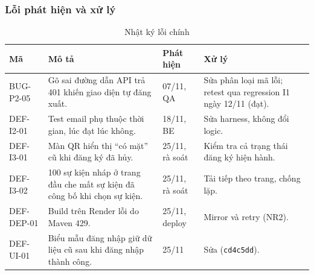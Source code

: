 \subsubsection{Lỗi phát hiện và xử lý}

\begin{table}[H]
\centering\footnotesize
\caption{Nhật ký lỗi chính}\label{tab:t3-defects}
\begin{tabularx}{\linewidth}{@{}p{.12\linewidth}Xp{.10\linewidth}p{.25\linewidth}@{}}
\toprule
\textbf{Mã} & \textbf{Mô tả} & \textbf{Phát hiện} & \textbf{Xử lý}\\\midrule
BUG-P2-05 & Gõ sai đường dẫn API trả 401 khiến giao diện tự đăng xuất. & 07/11, QA & Sửa phân loại mã lỗi; retest qua regression I1 ngày 12/11 (đạt).\\
DEF-I2-01 & Test email phụ thuộc thời gian, lúc đạt lúc không. & 18/11, BE & Sửa harness, không đổi logic.\\
DEF-I3-01 & Màn QR hiển thị ``có mặt'' cũ khi đăng ký đã hủy. & 25/11, rà soát & Kiểm tra cả trạng thái đăng ký hiện hành.\\
DEF-I3-02 & 100 sự kiện nháp ở trang đầu che mất sự kiện đã công bố khi chọn sự kiện. & 25/11, rà soát & Tải tiếp theo trang, chống lặp.\\
DEF-DEP-01 & Build trên Render lỗi do Maven 429. & 25/11, deploy & Mirror và retry (NR2).\\
DEF-UI-01 & Biểu mẫu đăng nhập giữ dữ liệu cũ sau khi đăng nhập thành công. & 25/11 & Sửa (\texttt{cd4c5dd}).\\
\bottomrule
\end{tabularx}
\end{table}
